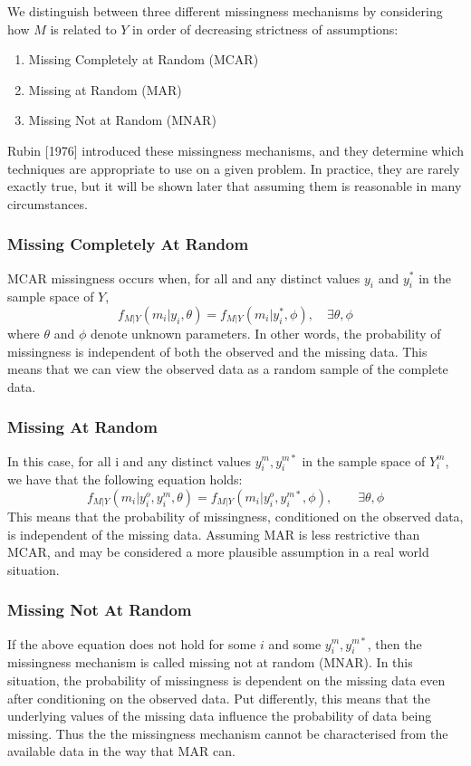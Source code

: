 \documentclass{article}
\begin{document}
	We distinguish between three different missingness mechanisms by considering how $M$ is related to $Y$ in order of decreasing strictness of assumptions: 
	
	\begin{enumerate}
		\item Missing Completely at Random (MCAR)
		\item Missing at Random (MAR)
		\item Missing Not at Random (MNAR)
	\end{enumerate}
	
	 Rubin [1976] introduced these missingness mechanisms, and they determine which techniques are appropriate to use on a given problem. In practice, they are rarely exactly true, but it will be shown later that assuming them is reasonable in many circumstances.
	
	\subsubsection{Missing Completely At Random}
	 MCAR missingness occurs when, for all and any distinct values $y_{i}$ and $ y^{\ast}_{i}$ in the sample space of $Y$, $$f_{M|Y}(m_{i}|y_{i}, \theta) = f_{M|Y}(m_{i}|y^{\ast}_{i}, \phi), \quad \exists \theta, \phi$$ where $\theta$ and $\phi$ denote unknown parameters. In other words, the probability of missingness is independent of both the observed and the missing data. This means that we can view the observed data as a random sample of the complete data.
	
	\subsubsection{Missing At Random}
	In this case, for all i and any distinct values $y^{m}_{i}, y^{m\ast}_{i}$ in the sample space of $Y^{m}_{i}$, we have that the following equation holds: $$f_{M|Y}(m_{i}|y^{o}_{i}, y^{m}_{i}, \theta) = f_{M|Y}(m_{i}|y^{o}_{i}, y^{m\ast}_{i}, \phi), \qquad \exists \theta, \phi$$
	This means that the probability of missingness, conditioned on the observed data, is independent of the missing data. Assuming MAR is less restrictive than MCAR, and may be considered a more plausible assumption in a real world situation. 
	
	\subsubsection{Missing Not At Random}
	If the above equation does not hold for some $i$ and some $y^{m}_{i}, y^{m\ast}_{i}$, then the missingness mechanism is called missing not at random (MNAR). In this situation, the probability of missingness is dependent on the missing data even after conditioning on the observed data. Put differently, this means that the underlying values of the missing data influence the probability of data being missing. Thus the the missingness mechanism cannot be characterised from the available data in the way that MAR can.
	
\end{document}
